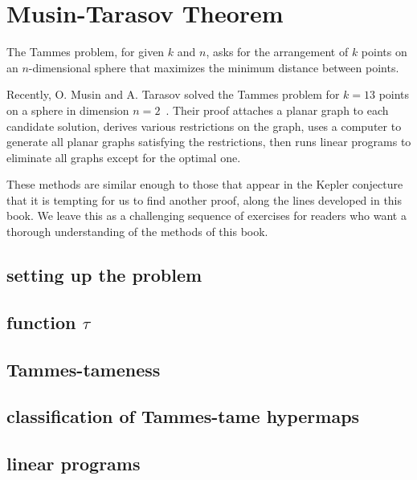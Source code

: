 \section{Musin-Tarasov Theorem}

The Tammes problem, for given $k$ and $n$, asks for the arrangement of
$k$ points on an $n$-dimensional sphere that maximizes the minimum
distance between points.

Recently, O. Musin and A. Tarasov solved the Tammes problem for $k=13$
points on a sphere in dimension $n=2$~\cite{Musin-Tarasov}.  Their
proof attaches a planar graph to each candidate solution, derives
various restrictions on the graph, uses a computer to generate all
planar graphs satisfying the restrictions, then runs linear programs
to eliminate all graphs except for the optimal one.

These methods are similar enough to those that appear in the Kepler
conjecture that it is tempting for us to find another proof, along the
lines developed in this book.  We leave this as a challenging sequence
of exercises for readers who want a thorough understanding
of the methods of this book.

\subsection{setting up the problem}

\subsection{function $\tau$}

\subsection{Tammes-tameness}

\subsection{classification of Tammes-tame hypermaps}

\subsection{linear programs}


